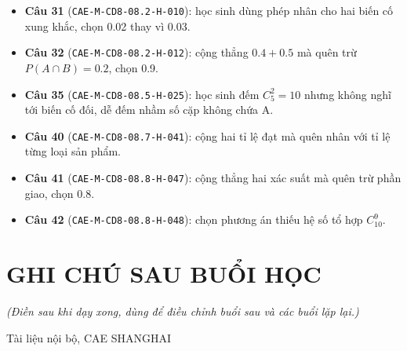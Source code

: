 \documentclass[11pt, a4paper]{article}
\begin{document}
\begin{itemize}[leftmargin=1.4em, itemsep=2pt]
\item \textbf{Câu 31} (\texttt{CAE-M-CD8-08.2-H-010}): học sinh dùng phép nhân cho hai biến cố xung khắc, chọn 0.02 thay vì 0.03.
\item \textbf{Câu 32} (\texttt{CAE-M-CD8-08.2-H-012}): cộng thẳng $0.4 + 0.5$ mà quên trừ $P(A \cap B) = 0.2$, chọn 0.9.
\item \textbf{Câu 35} (\texttt{CAE-M-CD8-08.5-H-025}): học sinh đếm $C_5^2 = 10$ nhưng không nghĩ tới biến cố đối, dễ đếm nhầm số cặp không chứa A.
\item \textbf{Câu 40} (\texttt{CAE-M-CD8-08.7-H-041}): cộng hai tỉ lệ đạt mà quên nhân với tỉ lệ từng loại sản phẩm.
\item \textbf{Câu 41} (\texttt{CAE-M-CD8-08.8-H-047}): cộng thẳng hai xác suất mà quên trừ phần giao, chọn 0.8.
\item \textbf{Câu 42} (\texttt{CAE-M-CD8-08.8-H-048}): chọn phương án thiếu hệ số tổ hợp $C_{10}^9$.
\end{itemize}

\section{GHI CHÚ SAU BUỔI HỌC}

\emph{(Điền sau khi dạy xong, dùng để điều chỉnh buổi sau và các buổi lặp lại.)}

\vspace{0.8cm}
\begin{center}
{\footnotesize\color{cae_blue} Tài liệu nội bộ, CAE SHANGHAI}
\end{center}
\end{document}

